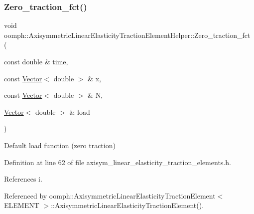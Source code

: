 \subsubsection{\texorpdfstring{Zero\+\_\+traction\+\_\+fct()}{Zero\_traction\_fct()}}
{\footnotesize\ttfamily void oomph\+::\+Axisymmetric\+Linear\+Elasticity\+Traction\+Element\+Helper\+::\+Zero\+\_\+traction\+\_\+fct (\begin{DoxyParamCaption}\item[{const double \&}]{time,  }\item[{const \hyperlink{classoomph_1_1Vector}{Vector}$<$ double $>$ \&}]{x,  }\item[{const \hyperlink{classoomph_1_1Vector}{Vector}$<$ double $>$ \&}]{N,  }\item[{\hyperlink{classoomph_1_1Vector}{Vector}$<$ double $>$ \&}]{load }\end{DoxyParamCaption})}



Default load function (zero traction) 



Definition at line 62 of file axisym\+\_\+linear\+\_\+elasticity\+\_\+traction\+\_\+elements.\+h.



References i.



Referenced by oomph\+::\+Axisymmetric\+Linear\+Elasticity\+Traction\+Element$<$ E\+L\+E\+M\+E\+N\+T $>$\+::\+Axisymmetric\+Linear\+Elasticity\+Traction\+Element().

